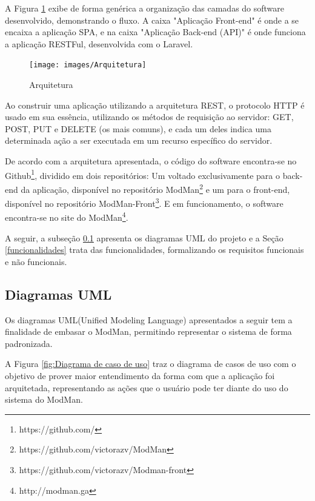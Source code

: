 A Figura \ref{fig:Diagrama da arquitetura} exibe de forma genérica a organização das camadas do software desenvolvido, demonstrando o fluxo. A caixa "Aplicação Front-end" é onde a se encaixa a aplicação SPA, e na caixa "Aplicação Back-end (API)" é onde funciona a aplicação RESTFul, desenvolvida com o Laravel.


\begin{figure}
	\texttt{[image: images/Arquitetura]}
	\caption{Arquitetura}
    \label{fig:Diagrama da arquitetura}
\end{figure}


Ao construir uma aplicação utilizando a arquitetura REST, o protocolo HTTP é usado em sua essência, utilizando os métodos de requisição ao servidor: GET, POST, PUT e DELETE (os mais comuns), e cada um deles indica uma determinada ação a ser executada em um recurso específico do servidor.


De acordo com a arquitetura apresentada, o código do software encontra-se no Github\footnote{https://github.com/}, dividido em dois repositórios: Um voltado exclusivamente para o back-end da aplicação, disponível no repositório ModMan\footnote{https://github.com/victorazv/ModMan} e um para o front-end, disponível no repositório ModMan-Front\footnote{https://github.com/victorazv/Modman-front}. E em funcionamento, o software encontra-se no site do ModMan\footnote{http://modman.ga}.


A seguir, a subseção \ref{diagramas} apresenta os diagramas UML do projeto e a Seção \ref{funcionalidades} trata das funcionalidades, formalizando os requisitos funcionais e não funcionais.


\subsection{Diagramas UML}\label{diagramas}


Os diagramas UML(Unified Modeling Language) apresentados a seguir tem a finalidade de embasar o ModMan, permitindo representar o sistema de forma padronizada.


A Figura \ref{fig:Diagrama de caso de uso} traz o diagrama de casos de uso com o objetivo de prover maior entendimento da forma com que a aplicação foi arquitetada, representando as ações que o usuário pode ter diante do uso do sistema do ModMan.


